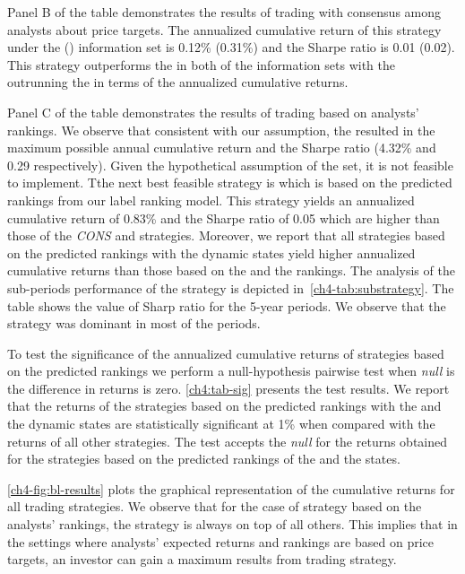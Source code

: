 \documentclass[a4paper,twoside,12pt,openright,notitlepage]{report}\usepackage[]{graphicx}\usepackage[]{color}
\begin{document}
Panel B of the table demonstrates the results of trading with consensus among analysts about price targets. The annualized cumulative return of this strategy under the \recent{} () information set is 0.12\% (0.31\%) and the Sharpe ratio is  0.01 (0.02). This strategy outperforms the \Market{} in both of the information sets with the  outrunning the \naive{} in terms of the annualized cumulative returns.

Panel C of the table demonstrates the results of trading based on analysts' rankings. We observe that consistent with our assumption, the \true{} resulted in the maximum possible annual cumulative return and the Sharpe ratio (4.32\% and  0.29 respectively). Given the hypothetical assumption of the \true{} set, it is not feasible to implement. Tthe next best feasible strategy is
\diff{}
which is based on the predicted rankings from our label ranking model. This strategy yields an annualized cumulative return of 0.83\% and the Sharpe ratio of 0.05 which are higher than those of the \textit{CONS} and \Market{} strategies. Moreover, we report that all strategies based on the predicted rankings with the dynamic states yield higher annualized cumulative returns than those  based on the  \naive{} and the  rankings. The analysis of the sub-periods performance of the \diff{} strategy is depicted in~\ref{ch4-tab:substrategy}. The table shows the value of Sharp ratio for the 5-year periods. We observe that the \diff{} strategy was dominant in most of the periods.

To test the significance of the annualized cumulative returns of strategies based on the predicted rankings we perform a null-hypothesis pairwise test when \emph{null} is the difference in returns is zero. \ref{ch4:tab-sig} presents the test results. We report that the returns of the strategies based on the predicted rankings with the \diff{} and the \random{} dynamic states are statistically significant at 1\% when compared with the returns of all other strategies. The test accepts the \emph{null} for the returns obtained for the strategies based on the predicted rankings of the \last{} and the \rollsd{} states.


\ref{ch4-fig:bl-results} plots the graphical representation of the cumulative returns for all  trading strategies. We observe that for the case of strategy based on the analysts' rankings, the \true{} strategy is always on top of all  others. This implies that in the settings where analysts' expected returns and rankings are based on price targets, an investor can gain a maximum results from trading strategy.
\end{document}

